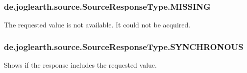 \subsubsection[{M\-I\-S\-S\-I\-N\-G}]{\setlength{\rightskip}{0pt plus 5cm}de.\-joglearth.\-source.\-Source\-Response\-Type.\-M\-I\-S\-S\-I\-N\-G}\label{enumde_1_1joglearth_1_1source_1_1_source_response_type_a700f09d51b496e9d5e16277207dbb6f9}
The requested value is not available. It could not be acquired. 
\subsubsection[{S\-Y\-N\-C\-H\-R\-O\-N\-O\-U\-S}]{\setlength{\rightskip}{0pt plus 5cm}de.\-joglearth.\-source.\-Source\-Response\-Type.\-S\-Y\-N\-C\-H\-R\-O\-N\-O\-U\-S}\label{enumde_1_1joglearth_1_1source_1_1_source_response_type_a9b13a891ce57550885a15767249bb3e7}
Shows if the response includes the requested value. 